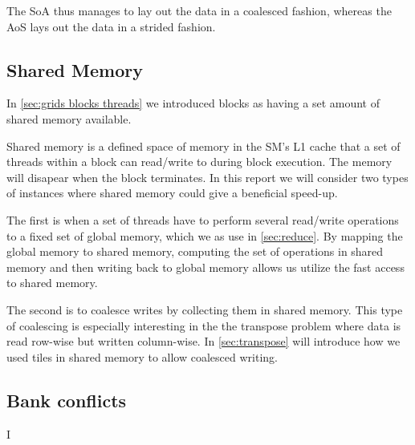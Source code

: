 The SoA thus manages to lay out the data in a coalesced fashion, whereas the AoS lays out the data in a strided fashion.

\subsection{Shared Memory}
\label{sec:shared memory}
In \cref{sec:grids blocks threads} we introduced blocks as having a set amount of shared memory available.

Shared memory is a defined space of memory in the SM's L1 cache that a set of threads within a block can read/write to during block execution.
The memory will disapear when the block terminates.
In this report we will consider two types of instances where shared memory could give a beneficial speed-up.

The first is when a set of threads have to perform several read/write operations to a fixed set of global memory, which we as use in \cref{sec:reduce}.
By mapping the global memory to shared memory, computing the set of operations in shared memory and then writing back to global memory allows us utilize the fast access to shared memory.

The second is to coalesce writes by collecting them in shared memory.
This type of coalescing is especially interesting in the the transpose problem where data is read row-wise but written column-wise. 
In \cref{sec:transpose} will introduce how we used tiles in shared memory to allow coalesced writing.
\subsection{Bank conflicts}
\label{sec:bank conflicts}
I
